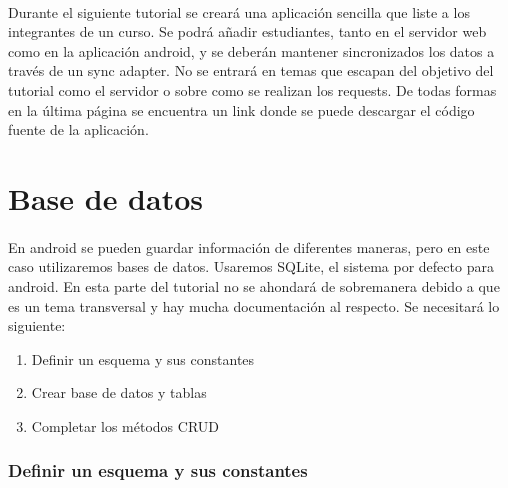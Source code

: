 \documentclass[10pt]{extarticle}
\begin{document}
\paragraph{}
Durante el siguiente tutorial se creará una aplicación sencilla que liste a los integrantes de un curso. Se podrá añadir estudiantes, tanto en el servidor web como en la aplicación android, y se deberán mantener sincronizados los datos a través de un sync adapter. No se entrará en temas que escapan del objetivo del tutorial como el servidor o sobre como se realizan los requests. De todas formas en la última página se encuentra un link donde se puede descargar el código fuente de la aplicación.

\section{Base de datos}

\paragraph{}
En android se pueden guardar información de diferentes maneras, pero en este caso utilizaremos bases de datos. Usaremos SQLite, el sistema por defecto para android. En esta parte del tutorial no se ahondará de sobremanera debido a que es un tema transversal y hay mucha documentación al respecto. Se necesitará lo siguiente:

\begin{enumerate}
 \item Definir un esquema y sus constantes
 \item Crear base de datos y tablas
 \item Completar los métodos CRUD
\end{enumerate}

\subsubsection{Definir un esquema y sus constantes}
\end{document}
